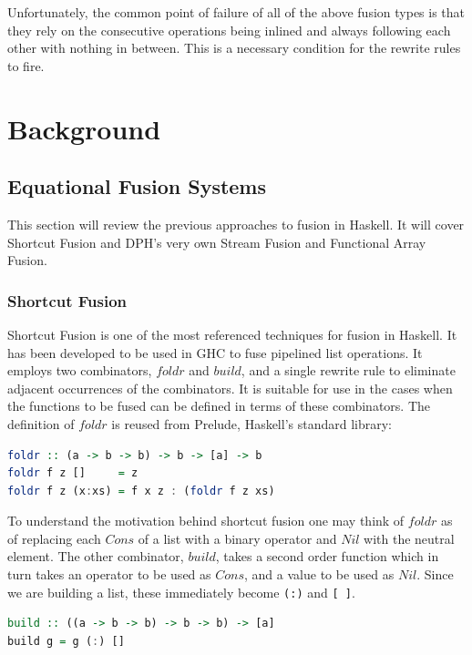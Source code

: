 \documentclass[preamble.tex]{subfiles}
\begin{document}
Unfortunately, the common point of failure of all of the above fusion types is that they rely on the consecutive operations being inlined and always following each other with nothing in between. This is a necessary condition for the rewrite rules to fire.


\pagebreak
\section{Background}


\subsection{Equational Fusion Systems}

This section will review the previous approaches to fusion in Haskell. It will cover Shortcut Fusion and DPH's very own Stream Fusion and Functional Array Fusion.


\subsubsection{Shortcut Fusion}

Shortcut Fusion \cite{GLP93} is one of the most referenced techniques for fusion in Haskell. It has been developed to be used in GHC to fuse pipelined list operations. It employs two combinators, $foldr$ and $build$, and a single rewrite rule to eliminate adjacent occurrences of the combinators. It is suitable for use in the cases when the functions to be fused can be defined in terms of these combinators. $ $The definition of $foldr$ is reused from Prelude, Haskell's standard library:

\begin{lstlisting}[basicstyle={\ttfamily},language=Haskell]
foldr :: (a -> b -> b) -> b -> [a] -> b
foldr f z []     = z
foldr f z (x:xs) = f x z : (foldr f z xs)
\end{lstlisting}


To understand the motivation behind shortcut fusion one may think of $foldr$ as of replacing each $Cons$ of a list with a binary operator and $Nil$ with the neutral element. The other combinator, $build$, takes a second order function which in turn takes an operator to be used as $Cons$, and a value to be used as $Nil$. Since we are building a list, these immediately become \texttt{(:)} and \texttt{{[} {]}}.

\begin{lstlisting}[basicstyle={\ttfamily},language=Haskell]
build :: ((a -> b -> b) -> b -> b) -> [a]
build g = g (:) []
\end{lstlisting}
\end{document}
